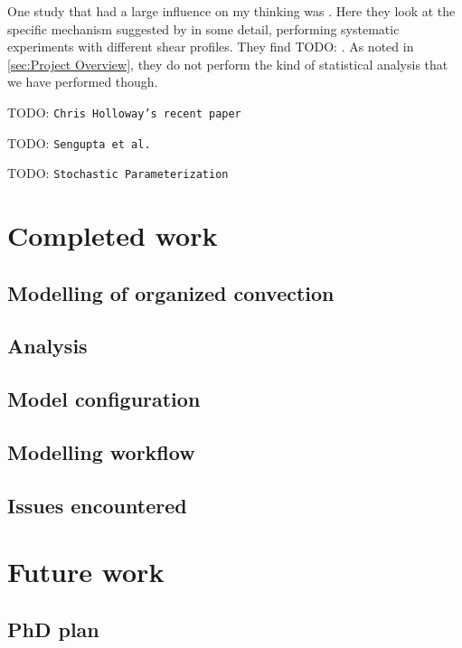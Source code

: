 \documentclass[11pt,a4paper]{article}
\newcommand{\todo}{TODO: \texttt}
\begin{document}
One study that had a large influence on my thinking was \cite{RE2001}. Here they look at the specific mechanism suggested by \cite{RKW1988} in some detail, performing systematic experiments with different shear profiles. They find \todo{}. As noted in \ref{sec:Project Overview}, they do not perform the kind of statistical analysis that we have performed though.

\todo{Chris Holloway's recent paper}

\todo{Sengupta et al.}

\todo{Stochastic Parameterization}

\section{Completed work}

\subsection{Modelling of organized convection}
\label{sec:modelling_org}



\subsection{Analysis}
\label{sec:analysis}

\subsection{Model configuration}
\label{sec:modelling_config}

\subsection{Modelling workflow}
\label{sec:modelling_workflow}

\subsection{Issues encountered}
\label{sec:issues}

\section{Future work}

\subsection{PhD plan}
\end{document}
